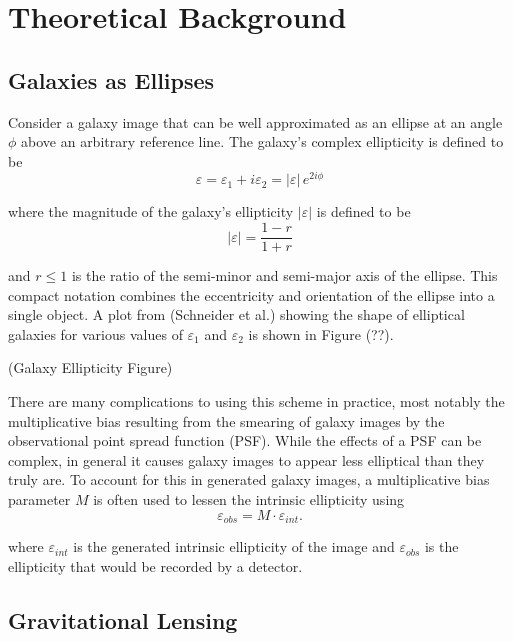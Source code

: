 \documentclass[%
 reprint,
 amsmath,amssymb,
 aps,
]{revtex4-1}
\begin{document}
\section{Theoretical Background}

\subsection*{Galaxies as Ellipses}
Consider a galaxy image that can be well approximated as an ellipse at an angle $\phi$ above an arbitrary reference line. The galaxy's complex ellipticity is defined to be 
\begin{equation}\label{complex_ellipticity}
\varepsilon=\varepsilon_1+i\varepsilon_2=|\varepsilon|\,e^{2i\phi}
\end{equation}

\noindent where the magnitude of the galaxy's ellipticity $|\varepsilon|$ is defined to be
\begin{equation}
|\varepsilon|=\frac{1-r}{1+r}
\end{equation}

\noindent and $r\leq1$ is the ratio of the semi-minor and semi-major axis of the ellipse. This compact notation combines the eccentricity and orientation of the ellipse into a single object. A plot from (Schneider et al.) showing the shape of elliptical galaxies for various values of $\varepsilon_1$ and $\varepsilon_2$ is shown in Figure (??).

(Galaxy Ellipticity Figure)

There are many complications to using this scheme in practice, most notably the multiplicative bias resulting from the smearing of galaxy images by the observational point spread function (PSF)\cite{multiplicative_bias}. While the effects of a PSF can be complex, in general it causes galaxy images to appear less elliptical than they truly are. To account for this in generated galaxy images, a multiplicative bias parameter $M$ is often used to lessen the intrinsic ellipticity using
$$\varepsilon_{obs}=M\cdot\varepsilon_{int}.$$

\noindent where $\varepsilon_{int}$ is the generated intrinsic ellipticity of the image and $\varepsilon_{obs}$ is the ellipticity that would be recorded by a detector.

\subsection*{Gravitational Lensing}
\end{document}
